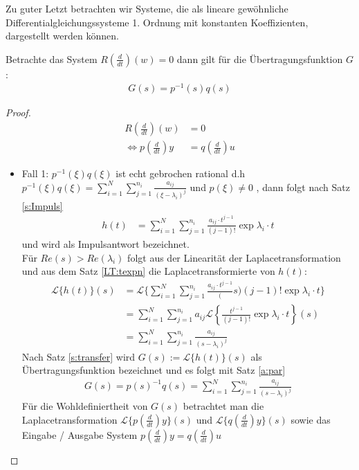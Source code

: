 Zu guter Letzt betrachten wir Systeme, die als lineare gewöhnliche Differentialgleichungssysteme 1. Ordnung mit konstanten Koeffizienten, dargestellt werden können.
\begin{satz}\label{sys:general} 
Betrachte das System $R(\frac{d}{dt})(w)=0$ dann gilt für die Übertragungsfunktion $G$:
\begin{align}
	G(s) = p^{-1}(s)q(s)
\end{align}
\begin{proof}
	\begin{align}
		R(\frac{d}{dt})(w) &= 0 \\
		\Leftrightarrow p(\frac{d}{dt})y &= q(\frac{d}{dt})u
	\end{align}
	\begin{itemize}
		\item Fall 1: $p^{-1}(\xi) q(\xi)$ ist echt gebrochen rational d.h $p^{-1}(\xi) q(\xi) = \sum_{i=1}^{N}{\sum^{n_i}_{j=1}{\frac{a_{ij}}{(\xi - \lambda_i)^j}}}$ und $p(\xi) \neq 0$ , dann folgt nach Satz \ref{s:Impuls}
		\begin{align}
			h(t) &=\sum_{i=1}^{N}{\sum^{n_i}_{j=1}{\frac{a_{ij}\cdot t^{j-1}}{(j-1)!}\exp{\lambda_i\cdot t}}} 
		\end{align}
		und wird als Impulsantwort bezeichnet. \\
		Für $Re(s) > Re(\lambda_i)$ folgt aus der Linearität der Laplacetransformation und aus dem Satz \ref{LT:texpn} die Laplacetransformierte von $h(t)$:
		\begin{align}
			\mathscr{L}\{h(t)\}(s) &= \mathscr{L}\{ \sum_{i=1}^{N}{\sum^{n_i}_{j=1}{\frac{a_{ij}\cdot t^{j-1}}(s){(j-1)!}\exp{\lambda_i\cdot t}}}\} \\ 
			&=  \sum_{i=1}^{N}{\sum^{n_i}_{j=1}{ a_{ij} \mathscr{L}\left\{ \frac{t^{j-1}}{(j-1)!}\exp{\lambda_i\cdot t} \right\}}}(s) \\
			&=  \sum_{i=1}^{N}{\sum^{n_i}_{j=1}{ \frac{a_{ij}}{(s-\lambda_i)^j}}}
		\end{align}
		Nach Satz \ref{s:transfer} wird $G(s):=\mathscr{L}\{h(t)\}(s)$ als Übertragungsfunktion bezeichnet und es folgt mit Satz \ref{a:par}
		\begin{align}
			G(s) = p(s)^{-1}q(s) = \sum_{i=1}^{N}{\sum^{n_i}_{j=1}{\frac{a_{ij}}{(s - \lambda_i)^j}}} 
		\end{align}	
		Für die Wohldefiniertheit von $G(s)$ betrachtet man die Laplacetransformation $\mathscr{L}\{p(\frac{d}{dt})y\}(s)$ und $\mathscr{L}\{q(\frac{d}{dt})y\}(s)$ sowie das Eingabe / Ausgabe System $p(\frac{d}{dt})y = q(\frac{d}{dt})u$

\end{itemize}
\end{proof}
\end{satz}
